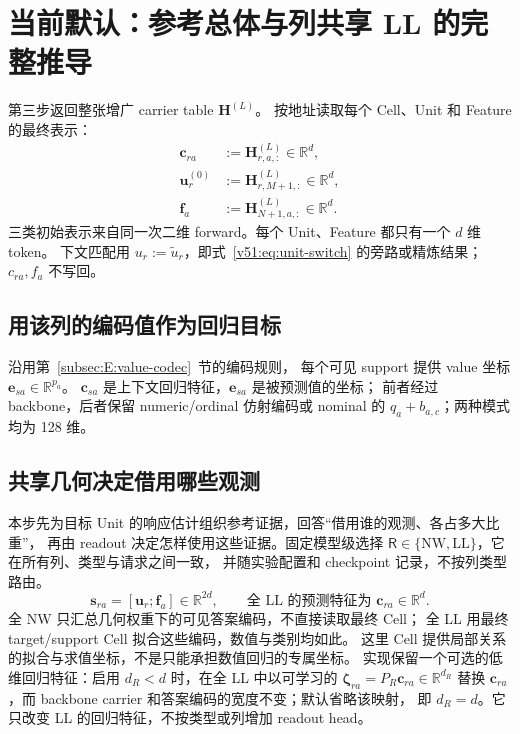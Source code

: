 \documentclass[11pt,UTF8,fontset=fandol]{ctexart}
\numberwithin{equation}{section}
\theoremstyle{definition}
\newcommand{\R}{\mathbb R}
\newcommand{\coreboxed}[1]{\boxed{#1}}
\begin{document}
\section{当前默认：参考总体与列共享 LL 的完整推导}
\label{v51:app:shared-ll}
第三步返回整张增广 carrier table $\bm H^{(L)}$。
按地址读取每个 Cell、Unit 和 Feature 的最终表示：
\begin{equation}
\begin{aligned}
 \bm c_{ra}&:=\bm H^{(L)}_{r,a,:}\in\R^d,\\
 \bm u_r^{(0)}&:=\bm H^{(L)}_{r,M+1,:}\in\R^d,\\
 \bm f_a&:=\bm H^{(L)}_{N+1,a,:}\in\R^d.
\end{aligned}
\label{front:eq:single-token-views}
\end{equation}
三类初始表示来自同一次二维 forward。每个 Unit、Feature 都只有一个 $d$ 维 token。
下文匹配用 $u_r:=\widetilde u_r$，即式~\eqref{v51:eq:unit-switch} 的旁路或精炼结果；$c_{ra},f_a$ 不写回。

\subsection{用该列的编码值作为回归目标}
沿用第~\ref{subsec:E:value-codec}~节的编码规则，
每个可见 support 提供 value 坐标 $\bm e_{sa}\in\R^{p_a}$。
$\bm c_{sa}$ 是上下文回归特征，$\bm e_{sa}$ 是被预测值的坐标；
前者经过 backbone，后者保留 numeric/ordinal 仿射编码或 nominal 的 $q_a+b_{a,c}$；两种模式均为 128 维。

\subsection{共享几何决定借用哪些观测}
本步先为目标 Unit 的响应估计组织参考证据，回答“借用谁的观测、各占多大比重”，
再由 readout 决定怎样使用这些证据。固定模型级选择
$\mathsf R\in\{\mathrm{NW},\mathrm{LL}\}$，它在所有列、类型与请求之间一致，
并随实验配置和 checkpoint 记录，不按列类型路由。
\begin{equation}
 \coreboxed{\bm s_{ra}=[\bm u_r;\bm f_a]\in\R^{2d},\qquad
 \text{全 LL 的预测特征为 }\bm c_{ra}\in\R^d.}
 \label{front:eq:restoration-response}
\end{equation}
全 NW 只汇总几何权重下的可见答案编码，不直接读取最终 Cell；
全 LL 用最终 target/support Cell 拟合这些编码，数值与类别均如此。
这里 Cell 提供局部关系的拟合与求值坐标，不是只能承担数值回归的专属坐标。
实现保留一个可选的低维回归特征：启用 $d_R<d$ 时，在全 LL
中以可学习的 $\bm\zeta_{ra}=P_{\!R}\bm c_{ra}\in\R^{d_R}$ 替换
$\bm c_{ra}$，而 backbone carrier 和答案编码的宽度不变；默认省略该映射，
即 $d_R=d$。它只改变 LL 的回归特征，不按类型或列增加 readout head。
\end{document}
